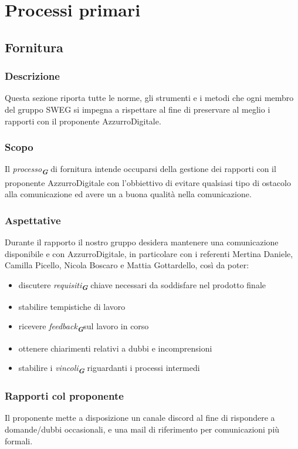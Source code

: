 

\section{Processi primari}
\subsection{Fornitura}
\subsubsection{Descrizione}
Questa sezione riporta tutte le norme, gli strumenti e i metodi che ogni membro del gruppo SWEG si impegna a rispettare al fine di preservare al meglio i rapporti con il proponente AzzurroDigitale.
\subsubsection{Scopo}
Il \emph{processo}\textsubscript{\textit{\textbf{G}}} di fornitura intende occuparsi della gestione dei rapporti con il proponente AzzurroDigitale con l’obbiettivo di evitare qualsiasi tipo di ostacolo alla comunicazione ed avere un a buona qualità nella comunicazione.
\subsubsection{Aspettative}
Durante il rapporto il nostro gruppo desidera mantenere una comunicazione disponibile e con AzzurroDigitale, in particolare con i referenti Mertina Daniele, Camilla Picello, Nicola Boscaro e Mattia Gottardello, così da poter:
\begin{itemize}
\item discutere \emph{requisiti}\textsubscript{\textit{\textbf{G}}} chiave necessari da soddisfare nel prodotto finale
\item stabilire tempistiche di lavoro
\item ricevere \emph{feedback}\textsubscript{\textit{\textbf{G}}}sul lavoro in corso
\item ottenere chiarimenti relativi a dubbi e incomprensioni
\item stabilire i \emph{vincoli}\textsubscript{\textit{\textbf{G}}} riguardanti i processi intermedi
\end{itemize}
\subsubsection{Rapporti col proponente}
Il proponente mette a disposizione un canale discord al fine di rispondere a domande/dubbi occasionali, e una mail di riferimento per comunicazioni più formali.

